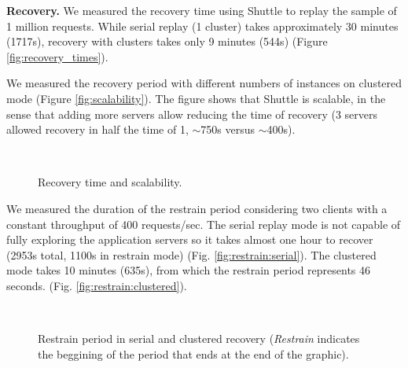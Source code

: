 \textbf{Recovery.}
We measured the recovery time using Shuttle to replay the sample of 1 million requests. While serial replay (1 cluster) takes approximately 30 minutes (1717s), recovery with clusters takes only 9 minutes (544s) (Figure \ref{fig:recovery_times}).

We measured the recovery period with different numbers of instances on clustered mode (Figure \ref{fig:scalability}). The figure shows that Shuttle is scalable, in the sense that adding more servers allow reducing the time of recovery (3 servers allowed recovery in half the time of 1, $\sim$750s versus $\sim$400s). 

\begin{figure}[tbh]
\vspace{-5mm}
  \LARGE
  \mbox{
  }
  \caption{Recovery time and scalability.}
  \vspace{-3mm}
\end{figure}

We measured the duration of the restrain period considering two clients with a constant throughput of 400 requests/sec. The serial replay mode is not capable of fully exploring the application servers so it takes almost one hour to recover (2953s total, 1100s in restrain mode) (Fig. \ref{fig:restrain:serial}). The clustered mode takes 10 minutes (635s), from which the restrain period represents 46 seconds. (Fig. \ref{fig:restrain:clustered}).

\begin{figure}[tbh]
\vspace{-5mm}
  \LARGE
  \mbox{
  }
  \caption{Restrain period in serial and clustered recovery (\emph{Restrain} indicates the beggining of the period that ends at the end of the graphic).}
  \vspace{-3mm}
\end{figure}


